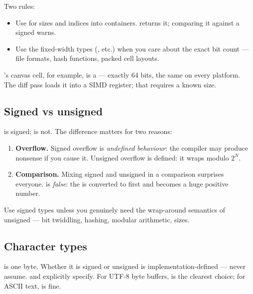 Two rules:

\begin{itemize}[leftmargin=*]
  \item Use  for sizes and indices into
    containers.  returns it; comparing it
    against a signed  warns.
  \item Use the fixed-width types (, etc.) when
    you care about the exact bit count --- file formats, hash
    functions, packed cell layouts.
\end{itemize}

\maya{}'s canvas cell, for example, is a  ---
exactly 64 bits, the same on every platform. The diff pass loads it
into a SIMD register; that requires a known size.

\subsection{Signed vs unsigned}

 is signed;  is not. The difference
matters for two reasons:

\begin{enumerate}[leftmargin=*]
  \item \textbf{Overflow.} Signed overflow is
    \emph{undefined behaviour}: the compiler may produce nonsense
    if you cause it. Unsigned overflow is defined: it wraps modulo
    $2^N$.
  \item \textbf{Comparison.} Mixing signed and unsigned in a
    comparison surprises everyone.  is
    \emph{false}: the  is converted to 
    first and becomes a huge positive number.
\end{enumerate}

Use signed types unless you genuinely need the wrap-around semantics
of unsigned --- bit twiddling, hashing, modular arithmetic, sizes.

\subsection{Character types}

 is one byte. Whether it is signed or unsigned is
implementation-defined --- never assume.  and
 explicitly specify. For UTF-8 byte buffers,
 is the clearest choice; for ASCII text,
 is fine.

